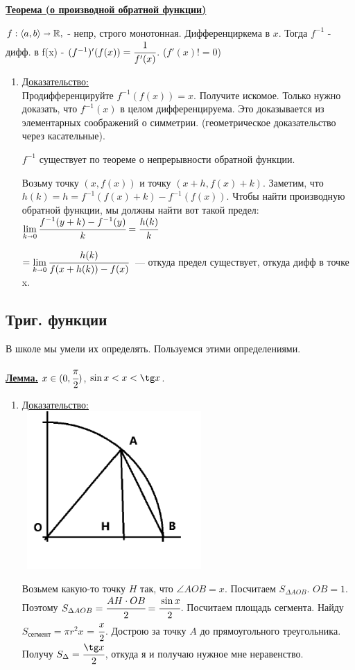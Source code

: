 \documentclass{article}
\newcommand{\thmm}[1]{\underline{\textbf{#1}}}
\newcommand{\prooff}[1]{{\underline{Доказательство:}} \\ }
\begin{document}
\thmm{Теорема (о производной обратной функции)}

$f: \langle a,b \rangle \shortrightarrow \mathbb{R},$ - непр, строго монотонная. Дифференциркема в $x$. Тогда $f^{-1}$ - дифф. в f(x) - $(f^{-1})'(f(x)) = \cfrac{1}{f'(x)}$. ($f'(x)!=0$)
\begin{enumerate}
    \item[] \prooff{}
    Продифференцируйте $f^{-1}(f(x)) = x$. Получите искомое. Только нужно доказать, что $f^{-1}(x)$ в целом дифференцируема. Это доказывается из элементарных соображений о симметрии. (геометрическое доказательство через касательные). 

    $f^{-1}$ существует по теореме о непрерывности обратной функции.

    Возьму точку $(x,f(x))$ и точку $(x+h,f(x)+k)$. Заметим, что $h(k)=h = f^{-1}(f(x)+k) - f^{-1}(f(x))$. Чтобы найти производную обратной функции, мы должны найти вот такой предел: $\lim\limits_{k\shortrightarrow 0} \cfrac{f^{-1}(y+k)-f^{-1}(y)}{k} = \cfrac{h(k)}{k} $
    
    $= \lim\limits_{k\shortrightarrow 0} \cfrac{h(k)}{f(x + h(k)) - f(x)}$~--- откуда предел существует, откуда дифф в точке x. 
\end{enumerate}

\subsection{Триг. функции}

В школе мы умели их определять. Пользуемся этими определениями.

\thmm{Лемма.}
 $x \in (0, \cfrac{\pi}{2})$, $\sin x < x < \tg x$.
 
\begin{enumerate}
    \item[] \prooff{}
    \includegraphics[width=7cm, height=6cm]{images/trig_function_lemm.png}
    
    Возьмем какую-то точку $H$ так, что $\angle AOB = x$. Посчитаем $S_{\Delta AOB}$. $OB = 1$. Поэтому $S_{\Delta AOB} = \cfrac{AH \cdot OB}{2} = \cfrac{\sin x}{2}$. Посчитаем площадь сегмента. Найду $S_{\text{сегмент}} = \pi r^2 x$ = $\cfrac{x}{2}$. Дострою за точку $A$ до прямоугольного треугольника. Получу $S_{\Delta} = \cfrac{\tg x}{2}$, откуда я и получаю нужное мне неравенство.
\end{enumerate}
\end{document}
